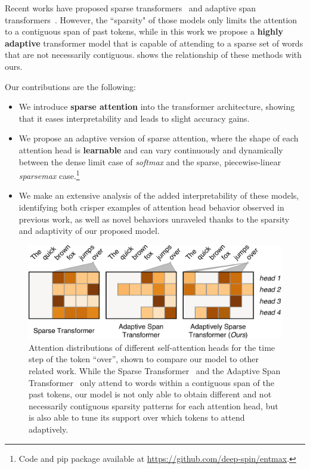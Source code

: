 Recent works have proposed sparse
transformers~\citep{openai_sparse_transf} and adaptive span
transformers~\citep{Sukhbaatar2019}. However, the ``sparsity" of those
models only limits the attention to a contiguous span of past tokens,
while in this work we propose a \textbf{highly adaptive} transformer
model that is capable of attending to a sparse set of words that are
not necessarily contiguous.  shows the
relationship of these methods with ours.

Our contributions are the following:

\begin{itemize}
    \item We introduce \textbf{sparse attention} into the
          transformer architecture, showing that it eases
          interpretability and leads to slight accuracy gains.
    \item We propose an adaptive version of sparse attention,
          where the shape of each attention head is {\bf learnable} and can vary continuously and
          dynamically between the dense limit case of \emph{softmax} and the sparse,
          piecewise-linear \emph{sparsemax} case.\footnote{
              Code and pip package available at \url{https://github.com/deep-spin/entmax}.}
    \item We make an extensive analysis of the added interpretability of these
          models, identifying both crisper examples of attention head behavior observed in
          previous work, as well as novel behaviors unraveled thanks to the sparsity
          and adaptivity of our proposed model.
\end{itemize}

\begin{figure}[t]
    \centering
    \includegraphics[width=0.95\columnwidth]{Figures/comparison.pdf}
    \caption[Comparison of Adaptively Sparse Transformers to related work.]{
        Attention distributions of different self-attention heads for the
        time step of the token ``over'', shown to compare our model to other
        related work. While the Sparse
        Transformer~\citep{openai_sparse_transf} and the Adaptive Span
        Transformer~\citep{Sukhbaatar2019} only attend to words within a
        contiguous span of the past tokens, our model is not only able to
        obtain different and not necessarily contiguous sparsity patterns for
        each attention head, but is also able to tune its support over which
        tokens to attend adaptively.}
    \label{fig:comparison}
\end{figure}

